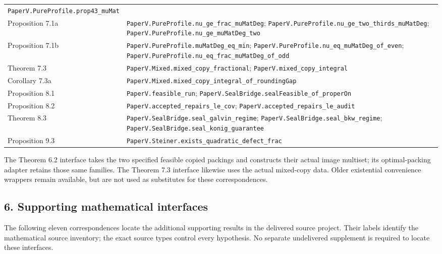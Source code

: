 \documentclass[english,11pt,a4paper]{article}
\begin{document}
{\begin{longtable}[]{@{}
  >{\raggedright\arraybackslash}p{}
  >{\raggedright\arraybackslash}p{}@{}}
\nolinkurl{PaperV.PureProfile.prop43_muMat} \\
Proposition 7.1a & \nolinkurl{PaperV.PureProfile.nu_ge_frac_muMatDeg};
\nolinkurl{PaperV.PureProfile.nu_ge_two_thirds_muMatDeg};
\nolinkurl{PaperV.PureProfile.nu_ge_muMatDeg_two} \\
Proposition 7.1b & \nolinkurl{PaperV.PureProfile.muMatDeg_eq_min};
\nolinkurl{PaperV.PureProfile.nu_eq_muMatDeg_of_even};
\nolinkurl{PaperV.PureProfile.nu_eq_frac_muMatDeg_of_odd} \\
Theorem 7.3 & \nolinkurl{PaperV.Mixed.mixed_copy_fractional};
\nolinkurl{PaperV.mixed_copy_integral} \\
Corollary 7.3a &
\nolinkurl{PaperV.Mixed.mixed_copy_integral_of_roundingGap} \\
Proposition 8.1 & \nolinkurl{PaperV.feasible_run};
\nolinkurl{PaperV.SealBridge.sealFeasible_of_properOn} \\
Proposition 8.2 & \nolinkurl{PaperV.accepted_repairs_le_cov};
\nolinkurl{PaperV.accepted_repairs_le_audit} \\
Theorem 8.3 & \nolinkurl{PaperV.SealBridge.seal_galvin_regime};
\nolinkurl{PaperV.SealBridge.seal_bkw_regime};
\nolinkurl{PaperV.SealBridge.seal_konig_guarantee} \\
Proposition 9.3 &
\nolinkurl{PaperV.Steiner.exists_quadratic_defect_frac} \\
\end{longtable}
}

The Theorem 6.2 interface takes the two specified feasible copied
packings and constructs their actual image multiset; its optimal-packing
adapter retains those same families. The Theorem 7.3 interface likewise
uses the actual mixed-copy data. Older existential convenience wrappers
remain available, but are not used as substitutes for these
correspondences.

\subsection{6. Supporting mathematical
interfaces}\label{supporting-mathematical-interfaces}

The following eleven correspondences locate the additional supporting
results in the delivered source project. Their labels identify the
mathematical source inventory; the exact source types control every
hypothesis. No separate undelivered supplement is required to locate
these interfaces.
\end{document}
